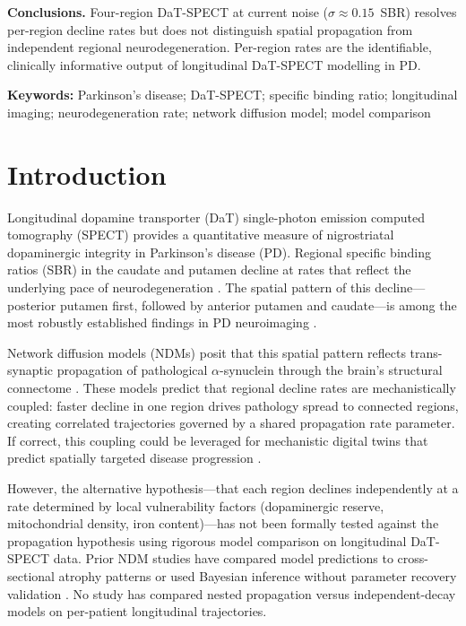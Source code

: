 \noindent\textbf{Conclusions.}
Four-region DaT-SPECT at current noise ($\sigma \approx 0.15$~SBR) resolves per-region decline rates but does not distinguish spatial propagation from independent regional neurodegeneration. Per-region rates are the identifiable, clinically informative output of longitudinal DaT-SPECT modelling in PD.

\vspace{0.4em}\noindent\textbf{Keywords:} Parkinson's disease; DaT-SPECT; specific binding ratio; longitudinal imaging; neurodegeneration rate; network diffusion model; model comparison

\section{Introduction}

Longitudinal dopamine transporter (DaT) single-photon emission computed tomography (SPECT) provides a quantitative measure of nigrostriatal dopaminergic integrity in Parkinson's disease (PD). Regional specific binding ratios (SBR) in the caudate and putamen decline at rates that reflect the underlying pace of neurodegeneration \cite{booij1997, siderowf2020, ren2024}. The spatial pattern of this decline---posterior putamen first, followed by anterior putamen and caudate---is among the most robustly established findings in PD neuroimaging \cite{kish1988, brooks1990, kim2022}.

Network diffusion models (NDMs) posit that this spatial pattern reflects trans-synaptic propagation of pathological $\alpha$-synuclein through the brain's structural connectome \cite{raj2012, pandya2019, vogel2023}. These models predict that regional decline rates are mechanistically coupled: faster decline in one region drives pathology spread to connected regions, creating correlated trajectories governed by a shared propagation rate parameter. If correct, this coupling could be leveraged for mechanistic digital twins that predict spatially targeted disease progression \cite{dupre2026paper7,dupre2026paper10}.

However, the alternative hypothesis---that each region declines independently at a rate determined by local vulnerability factors (dopaminergic reserve, mitochondrial density, iron content)---has not been formally tested against the propagation hypothesis using rigorous model comparison on longitudinal DaT-SPECT data. Prior NDM studies have compared model predictions to cross-sectional atrophy patterns \cite{raj2012, pandya2019, abdelgawad2022} or used Bayesian inference without parameter recovery validation \cite{schafer2021}. No study has compared nested propagation versus independent-decay models on per-patient longitudinal trajectories.

